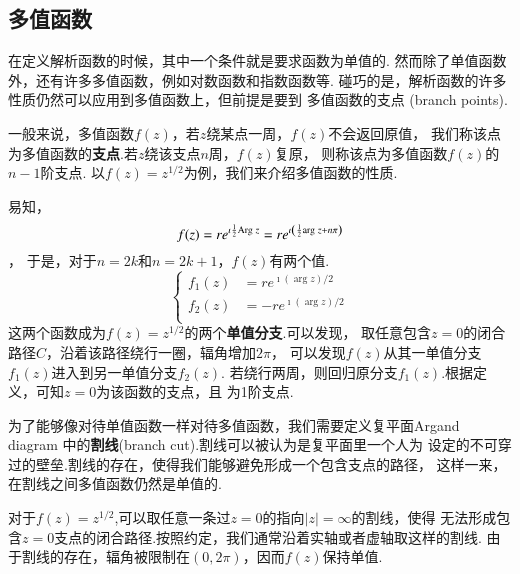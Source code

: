 \subsection{多值函数}
在定义解析函数的时候，其中一个条件就是要求函数为单值的.
然而除了单值函数外，还有许多多值函数，例如对数函数和指数函数等.
碰巧的是，解析函数的许多性质仍然可以应用到多值函数上，但前提是要到
多值函数的支点 (branch points).

一般来说，多值函数$f(z)$，若$z$绕某点一周，$f(z)$不会返回原值，
我们称该点为多值函数的\textbf{支点}.若$z$绕该支点$n$周，$f(z)$复原，
则称该点为多值函数$f(z)$的$n-1$阶支点.
以$f(z) = z^{1/2}$为例，我们来介绍多值函数的性质.

易知，\[
    f(z) = r e^{\imath {\frac{1}{2}}  {\mathrm{Arg}\;} z}
    =  r e^{\imath \left( {\frac{1}{2}} {\mathrm{arg}\;} z + n \pi \right)}
    \]，
于是，对于$n= 2k$和$n=2k+1$，$f(z)$有两个值.
\begin{equation}
    \left\{\begin{aligned}
    f_1(z) & =r e^{\imath(\arg z) / 2} \\
    f_2(z) & =-r e^{\imath(\arg z) / 2} \\
    \end{aligned}\right.
\end{equation}
这两个函数成为$f(z)= z^{1/2}$的两个\textbf{单值分支}.可以发现，
取任意包含$z=0$的闭合路径$C$，沿着该路径绕行一圈，辐角增加$2\pi$，
可以发现$f(z)$从其一单值分支$f_1(z)$进入到另一单值分支$f_2(z)$.
若绕行两周，则回归原分支$f_1(z)$.根据定义，可知$z=0$为该函数的支点，且
为1阶支点.

为了能够像对待单值函数一样对待多值函数，我们需要定义复平面Argand diagram
中的\textbf{割线}(branch cut).割线可以被认为是复平面里一个人为
设定的不可穿过的壁垒.割线的存在，使得我们能够避免形成一个包含支点的路径，
这样一来，在割线之间多值函数仍然是单值的.

对于$f(z)=z^{1/2}$,可以取任意一条过$z=0$的指向$|z|=\infty$的割线，使得
无法形成包含$z=0$支点的闭合路径.按照约定，我们通常沿着实轴或者虚轴取这样的割线.
由于割线的存在，辐角被限制在$(0,2\pi)$，因而$f(z)$保持单值.

